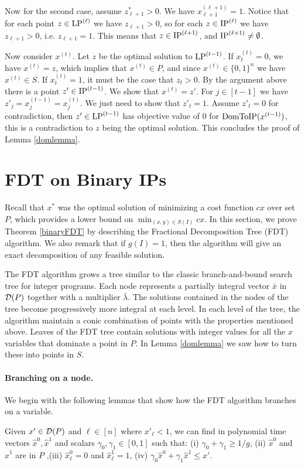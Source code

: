 Now for the second case, assume $z^*_{\ell+1} > 0$. We have $x^{(\ell+1)}_{\ell+1}=1$. Notice that for each point $z\in \operatorname{LP}^{(\ell)}$ we have $z_{\ell+1} >0$, so for each $z\in \operatorname{IP}^{(\ell)}$ we have $z_{\ell+1}>0$, i.e. $z_{\ell+1}=1$. This means that $z\in \operatorname{IP}^{(\ell+1)}$, and $\operatorname{IP}^{(\ell+1)} \neq \emptyset$.

Now consider $x^{(t)}$. Let $z$ be the optimal solution to $\operatorname{LP}^{(t-1)}$. If $x^{(t)}_t = 0$, we have $x^{(t)} = z$, which implies that $x^{(t)}\in P$, and since $x^{(t)}\in \{0,1\}^n$ we have $x^{(t)}\in S$. If $x^{(t)}_t =1$, it must be the case that $z_t > 0$. By the argument above there is a point $z'\in \operatorname{IP}^{(t-1)}$. We show that $x^{(t)} = z'$. For $j\in [t-1]$ we have $z'_j= x_j^{(t-1)}=x_j^{(t)}$. We just need to show that $z'_t = 1$. Assume $z'_t	 = 0$ for contradiction, then $z'\in \operatorname{LP}^{(t-1)}$ has objective value of $0$ for $\operatorname{{{DomToIP}}}(x^{(t-1)})$, this is a contradiction to $z$ being the optimal solution. This concludes the proof of Lemma \ref{domlemma}. 





\section{FDT on Binary IPs}
\label{sec:binaryfdt}
Recall that $x^*$ was the optimal solution of minimizing a cost function $cx$ over set $P$, which provides a lower bound on $\min_{(x,y)\in S(I)} cx$.  In this section, we prove Theorem \ref{binaryFDT} by describing the Fractional Decomposition Tree (FDT) algorithm. We also remark that if $g(I)=1$, then the algorithm will give an exact decomposition of any feasible solution. 


The FDT algorithm grows a tree similar to the classic branch-and-bound search tree for integer programs. Each node represents a partially integral vector $\bar{x}$ in $\operatorname{\mathcal{D}}(P)$ together with a multiplier $\bar{\lambda}$. The solutions contained in the nodes of the tree become progressively more integral at each level. In each level of the tree, the algorithm maintain a conic combination of points with the properties mentioned above. Leaves of the FDT tree contain solutions with integer values for all the $x$ variables that dominate a point in $P$. In Lemma  \ref{domlemma} we saw how to turn these into points in $S$. 

\paragraph{Branching on a node.}
We begin with the following lemmas that show how the FDT algorithm branches on a variable.
\begin{lemma}\label{LPClemma}
	Given $x'\in \operatorname{\mathcal{D}}(P)$ and $\ell\in [n]$ where $x'_{\ell}<1$, we can find in polynomial time vectors $\hat{x}^0,\hat{x}^1$ and scalars $\gamma_0,\gamma_1 \in [0,1]$ such that: (i) $\gamma_0 + \gamma_1  \geq 1/g$, (ii) $\hat{x}^0$ and $\hat{x}^1$ are in  $ P$
	,(iii) $\hat{x}^0_\ell=0$ and $\hat{x}^1_\ell=1$, (iv) $\gamma_0 \hat{x}^0 + \gamma_1\hat{x}^1 \leq x'$.
\end{lemma}


